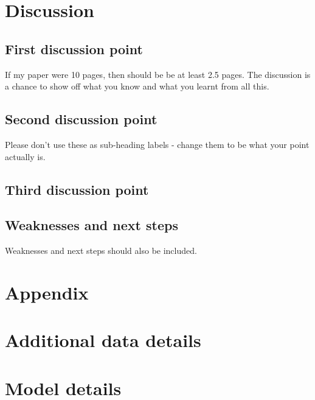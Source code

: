 \documentclass[
  letterpaper,
  DIV=11,
  numbers=noendperiod]{scrartcl}
\begin{document}
\section{Discussion}\label{discussion}

\subsection{First discussion point}\label{sec-first-point}

If my paper were 10 pages, then should be be at least 2.5 pages. The
discussion is a chance to show off what you know and what you learnt
from all this.

\subsection{Second discussion point}\label{second-discussion-point}

Please don't use these as sub-heading labels - change them to be what
your point actually is.

\subsection{Third discussion point}\label{third-discussion-point}

\subsection{Weaknesses and next steps}\label{weaknesses-and-next-steps}

Weaknesses and next steps should also be included.

\newpage

\appendix

\section*{Appendix}\label{appendix}

\section{Additional data details}\label{additional-data-details}

\section{Model details}\label{sec-model-details}
\end{document}
